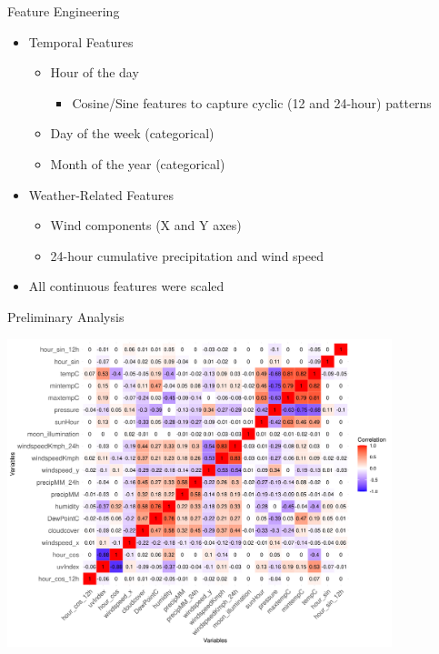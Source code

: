 \documentclass[svgnames, 12pt]{beamer}
\begin{document}
\begin{frame}{Feature Engineering}
\begin{itemize}
    \item Temporal Features
        \begin{itemize}
            \item Hour of the day
                \begin{itemize}
                    \item Cosine/Sine features to capture cyclic (12 and 24-hour) patterns
                \end{itemize}
            \item Day of the week (categorical)
            \item Month of the year (categorical)
        \end{itemize}
    \item Weather-Related Features
        \begin{itemize}
            \item Wind components (X and Y axes)
            \item 24-hour cumulative precipitation and wind speed
        \end{itemize}
    \item All continuous features were scaled
\end{itemize}
\end{frame}

\begin{frame}{Preliminary Analysis}
    \vspace{0.5em}
    \begin{center}
        \includegraphics[width=0.84\textwidth]{assets/feature-correlation-matrix-final.png}
    \end{center}
    \vfill
\end{frame}
\end{document}
